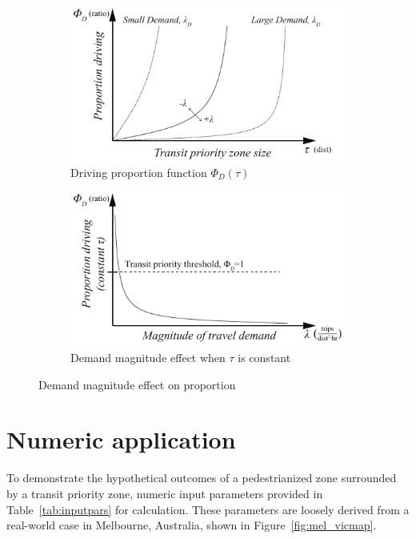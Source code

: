 \documentclass{elsarticle}\usepackage[]{graphicx}\usepackage[]{color}
\begin{document}
\begin{figure}[H]
     \centering
     \hfill
     \begin{subfigure}[b]{0.45\textwidth}
         \centering
         \includegraphics[width=\textwidth]{diagram_tau_pd}
         \caption{Driving proportion function $\Phi_D(\tau)$}
         \label{fig:taupd}
     \end{subfigure}
     \hfill
     \begin{subfigure}[b]{0.45\textwidth}
         \centering
         \includegraphics[width=\textwidth]{diagram_demand_pd}
        \caption{Demand magnitude effect when $\tau$ is constant}
         \label{fig:demandpd}
     \end{subfigure}
     \hfill
     \caption{Demand magnitude effect on proportion}
\end{figure}


\section{Numeric application}
To demonstrate the hypothetical outcomes of a pedestrianized zone surrounded by a transit priority zone, numeric input parameters provided in Table~\ref{tab:inputpars} for calculation. These parameters are loosely derived from a real-world case in Melbourne, Australia, shown in Figure~\ref{fig:mel_vicmap}.
\end{document}
